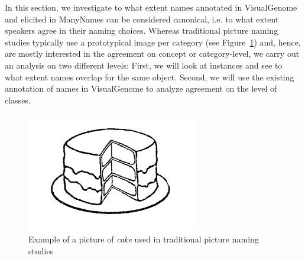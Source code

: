 %


In this section, we investigate to what extent names annotated in VisualGenome and elicited in ManyNames can be considered canonical, i.e. to what extent speakers agree in their naming choices.
Whereas traditional picture naming studies typically use a prototypical image per category (see Figure~\ref{fig:picture_naming}) and, hence, are mostly interested in the agreement on concept or category-level, we carry out an analysis on two different levels: First, we will look at instances and see to what extent names overlap for the same object. 
Second, we will use the existing annotation of names in VisualGenome to analyze agreement on the level of classes.
\begin{figure}[t]
	\centering
	\includegraphics[scale=.5]{figures/snodgrass_vanderwart_cake_042.png}
	\caption{Example of a picture of \textsl{cake} used in traditional picture naming studies \cite{snodgrass} \label{fig:picture_naming}}
\end{figure}

